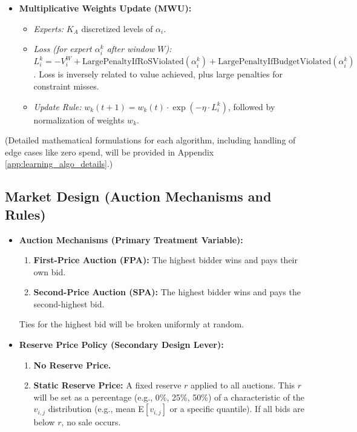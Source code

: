 \documentclass[12pt, a4paper]{article}
\begin{document}
\begin{itemize}
\begin{itemize}
            \item \textit{Update Rule:} Standard UCB1 arm selection and value updates.
        \end{itemize}
    \item \textbf{Multiplicative Weights Update (MWU):}
        \begin{itemize}
            \item \textit{Experts:} $K_A$ discretized levels of $\alpha_i$.
            \item \textit{Loss (for expert $\alpha_i^k$ after window $W$):} $L_i^k = -V_i^W + \text{LargePenaltyIfRoSViolated}(\alpha_i^k) + \text{LargePenaltyIfBudgetViolated}(\alpha_i^k)$. Loss is inversely related to value achieved, plus large penalties for constraint misses.
            \item \textit{Update Rule:} $w_k(t+1) = w_k(t) \cdot \exp(-\eta \cdot L_i^k)$, followed by normalization of weights $w_k$.
        \end{itemize}
\end{itemize}
(Detailed mathematical formulations for each algorithm, including handling of edge cases like zero spend, will be provided in Appendix \ref{app:learning_algo_details}.)

\subsection{Market Design (Auction Mechanisms and Rules)}
\begin{itemize}
    \item \textbf{Auction Mechanisms (Primary Treatment Variable):}
        \begin{enumerate}
            \item \textbf{First-Price Auction (FPA):} The highest bidder wins and pays their own bid.
            \item \textbf{Second-Price Auction (SPA):} The highest bidder wins and pays the second-highest bid.
        \end{enumerate}
        Ties for the highest bid will be broken uniformly at random.
    \item \textbf{Reserve Price Policy (Secondary Design Lever):}
        \begin{enumerate}
            \item \textbf{No Reserve Price.}
            \item \textbf{Static Reserve Price:} A fixed reserve $r$ applied to all auctions. This $r$ will be set as a percentage (e.g., 0\%, 25\%, 50\%) of a characteristic of the $v_{i,j}$ distribution (e.g., mean E$[v_{i,j}]$ or a specific quantile). If all bids are below $r$, no sale occurs.
        \end{enumerate}
\end{itemize}
\end{document}
